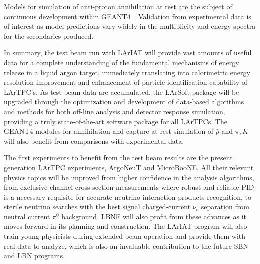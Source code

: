\documentclass[DIV=calc, paper=a4, fontsize=10pt, twocolumn]{scrartcl}	 %
\begin{document}
{Models for simulation of anti-proton annihilation at rest are the subject of continuous development within GEANT4~\cite{antip-annih}. Validation from experimental data is of interest as model predictions vary widely in the multiplicity and energy spectra for the secondaries produced.

In summary, the test beam run with LArIAT will provide vast amounts of useful data for a complete understanding of the fundamental mechanisms of energy release in a liquid argon target, immediately translating into calorimetric energy resolution improvement and enhancement of particle identification capability of LArTPC's.  As test beam data are accumulated, the LArSoft package will be upgraded through the optimization and development of data-based algorithms and methods for both off-line analysis and detector response simulation, providing a truly state-of-the-art software package for all LArTPCs. The GEANT4 modules for annihilation and capture at rest simulation of $\bar p$ and $\pi,K$ will also benefit from comparisons with experimental data.

The first experiments to benefit from the test beam results are the present generation LArTPC experiments, ArgoNeuT and  MicroBooNE.  All their relevant physics topics will be improved from higher confidence in the analysis algorithms, from exclusive channel cross-section measurements where robust and reliable PID is a necessary requisite for accurate neutrino interaction products recognition, to sterile neutrino searches with the best signal charged-current $\nu_e$ separation from neutral current $\pi^0$ background.  LBNE will also profit from these advances as it moves forward in its planning and construction. The LArIAT program will also train young physicists during extended beam operation and provide them with real data to analyze, which is also an invaluable contribution to the future SBN and LBN programs.

}
\end{document}
